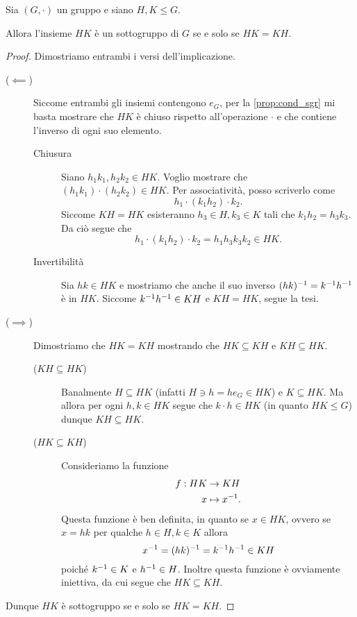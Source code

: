 \begin{proposition}
     Sia $(G, \cdot)$ un gruppo e siano $H,K \leq G$.

    Allora l'insieme $HK$ è un sottogruppo di $G$ se e solo se $HK = KH$.
\end{proposition}
\begin{proof}
    Dimostriamo entrambi i versi dell'implicazione.
    \begin{description}
        \item[($\impliedby$)] Siccome entrambi gli insiemi contengono $e_G$, per la \autoref{prop:cond_sgr} mi basta mostrare che $HK$ è chiuso rispetto all'operazione $\cdot$ e che contiene l'inverso di ogni suo elemento. 
        \begin{description}
            \item[Chiusura] Siano $h_1k_1, h_2k_2 \in HK$. Voglio mostrare che $(h_1k_1) \cdot (h_2k_2) \in HK$. Per associatività, posso scriverlo come \[
                h_1 \cdot (k_1h_2) \cdot k_2.    
            \] Siccome $KH = HK$ esisteranno $h_3 \in H, k_3 \in K$ tali che $k_1h_2 = h_3k_3$. Da ciò segue che \[
                h_1 \cdot (k_1h_2) \cdot k_2 = h_1h_3k_3k_2 \in HK.
            \]
            \item[Invertibilità] Sia $hk \in HK$ e mostriamo che anche il suo inverso $(hk)^{-1} = k^{-1} h^{-1}$ è in $HK$. Siccome $k^{-1} h^{-1} \in KH$ e $KH = HK$, segue la tesi.
        \end{description}
        \item[($\implies$)] Dimostriamo che $HK = KH$ mostrando che $HK \subseteq KH$ e $KH \subseteq HK$.
        \begin{description}
            \item[($KH \subseteq HK$)] Banalmente $H \subseteq HK$ (infatti $H \ni h = he_G \in HK$) e $K \subseteq HK$. Ma allora per ogni $h, k \in HK$ segue che $k \cdot h \in HK$ (in quanto $HK \leq G$) dunque $KH \subseteq HK$.
            \item[($HK \subseteq KH$)] Consideriamo la funzione \begin{align*}
                f : HK &\to KH\\
                x &\mapsto x^{-1}.
            \end{align*} Questa funzione è ben definita, in quanto se $x \in HK$, ovvero se $x = hk$ per qualche $h \in H, k \in K$ allora \[
                x^{-1} = (hk)^{-1} = k^{-1} h^{-1} \in KH    
            \] poiché $k^{-1} \in K$ e $h^{-1} \in H$. Inoltre questa funzione è ovviamente iniettiva, da cui segue che $HK \subseteq KH$.
        \end{description}
    \end{description}
    Dunque $HK$ è sottogruppo se e solo se $HK = KH$.
\end{proof}
